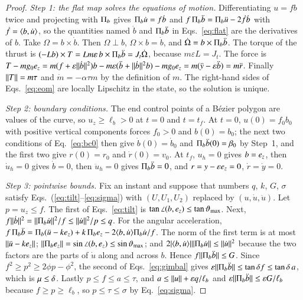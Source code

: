 \begin{proof}
\emph{Step 1: the flat map solves the equations of motion.} Differentiating $u=fb$ twice and projecting with $\Pi_b$ gives
$\Pi_b\dot u=f\dot b$ and $f\,\Pi_b\ddot b=\Pi_b\ddot u-2\dot f\dot b$ with $\dot f=\langle b,\dot u\rangle$, so the quantities named $\dot b$
and $\Pi_b\ddot b$ in Eqs.~\eqref{eq:flat} are the derivatives of $b$. Take $\Omega=b\times\dot b$. Then $\Omega\perp b$,
$\Omega\times b=\dot b$, and $\dot\Omega=b\times\Pi_b\ddot b$. The torque of the thrust is $(-Lb)\times T=Lm\varepsilon\,b\times\Pi_b\ddot b
=J_t\dot\Omega$, because $m\varepsilon L=J_t$. The force is $T-mg_0e_z=m(f+\varepsilon\lVert \dot b\rVert^2)b-m\varepsilon(\ddot b+\lVert \dot b\rVert^2b)-mg_0e_z
=m(\ddot y-\varepsilon\ddot b)=m\ddot r$. Finally $\lVert T\rVert=m\tau$ and $\dot m=-\alpha\tau m$ by the definition of $m$. The right-hand
sides of Eqs.~\eqref{eq:eom} are locally Lipschitz in the state, so the solution is unique.

\emph{Step 2: boundary conditions.} The end control points of a B\'ezier polygon are values of the curve, so $u_z\ge\ell_b>0$ at
$t=0$ and $t=t_f$. At $t=0$, $u(0)=f_0b_0$ with positive vertical components forces $f_0>0$ and $b(0)=b_0$; the next two
conditions of Eq.~\eqref{eq:bc0} then give $\dot b(0)=\dot b_0$ and $\Pi_b\ddot b(0)=\beta_0$ by Step~1, and the first two give
$r(0)=r_0$ and $\dot r(0)=v_0$. At $t_f$, $u_h=0$ gives $b=e_z$, then $\dot u_h=0$ gives $\dot b=0$, then $\ddot u_h=0$ gives
$\Pi_b\ddot b=0$, and $r=y-\varepsilon e_z=0$, $\dot r=\dot y=0$.

\emph{Step 3: pointwise bounds.} Fix an instant and suppose that numbers $q$, $k$, $G$, $\sigma$ satisfy
Eqs.~(\ref{eq:tilt}--\ref{eq:sigma}) with $(U,U_1,U_2)$ replaced by $(u,\dot u,\ddot u)$. Let $p=u_z\le f$. The first of
Eqs.~\eqref{eq:tilt} is $\tan\angle(b,e_z)\le\tan\vartheta_{\max}$. Next, $f\lVert \dot b\rVert^2=\lVert \Pi_b\dot u\rVert^2/f\le\lVert \dot u\rVert^2/p\le q$.
For the angular acceleration, $f\,\Pi_b\ddot b=\Pi_b(\ddot u-ke_z)+k\,\Pi_be_z-2\langle b,\dot u\rangle\Pi_b\dot u/f$. The norm of the first term is at
most $\lVert \ddot u-ke_z\rVert$; $\lVert \Pi_be_z\rVert=\sin\angle(b,e_z)\le\sin\vartheta_{\max}$; and
$2|\langle b,\dot u\rangle|\lVert \Pi_b\dot u\rVert\le\lVert \dot u\rVert^2$ because the two factors are the parts of $\dot u$ along and across $b$. Hence
$f\lVert \Pi_b\ddot b\rVert\le G$. Since $f^2\ge p^2\ge2\phi p-\phi^2$, the second of Eqs.~\eqref{eq:gimbal} gives
$\varepsilon\lVert \Pi_b\ddot b\rVert\le\tan\delta f\le\tan\delta\,a$, which is $\mu\le\delta$. Lastly $p\le f\le a\le\tau$, and
$a\le\lVert u\rVert+\varepsilon q/\ell_b$ and $\varepsilon\lVert \Pi_b\ddot b\rVert\le\varepsilon G/\ell_b$ because $f\ge p\ge\ell_b$, so
$p\le\tau\le\sigma$ by Eq.~\eqref{eq:sigma}.


\end{proof}

